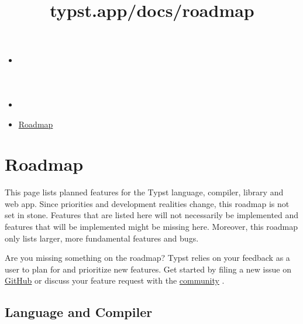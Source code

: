 \title{typst.app/docs/roadmap}

\begin{itemize}
\tightlist
\item
  \href{/docs}{}
\item
  
\item
  \href{/docs/roadmap/}{Roadmap}
\end{itemize}

\section{Roadmap}\label{roadmap}

This page lists planned features for the Typst language, compiler,
library and web app. Since priorities and development realities change,
this roadmap is not set in stone. Features that are listed here will not
necessarily be implemented and features that will be implemented might
be missing here. Moreover, this roadmap only lists larger, more
fundamental features and bugs.

Are you missing something on the roadmap? Typst relies on your feedback
as a user to plan for and prioritize new features. Get started by filing
a new issue on \href{https://github.com/typst/typst/issues}{GitHub} or
discuss your feature request with the
\href{https://typst.app/docs/community}{community} .

\subsection{Language and Compiler}\label{language-and-compiler}

